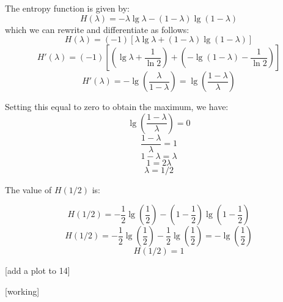 \documentclass[a4paper,12pt]{article}
\begin{document}
The entropy function is given by:
\[ H(\lambda) = -\lambda \lg \lambda - (1-\lambda) \lg (1-\lambda) \]
which we can rewrite and differentiate as follows:
\[ H(\lambda) = (-1)\left[\lambda \lg \lambda + (1-\lambda)\lg (1-\lambda) \right] \]
\[ H'(\lambda) = (-1)\left[\left( \lg \lambda + \frac{1}{\ln 2}\right) + \left(-\lg(1-\lambda) - \frac{1}{\ln 2}\right) \right] \]
\[ H'(\lambda) = -\lg \left(\frac{\lambda}{1-\lambda}\right) = \lg\left(\frac{1-\lambda}{\lambda}\right)\]

Setting this equal to zero to obtain the maximum, we have:
\[ \lg\left(\frac{1 - \lambda}{\lambda} \right) = 0 \]
\[ \frac{1 - \lambda}{\lambda} = 1 \]
\[ 1 - \lambda = \lambda \]
\[ 1 = 2 \lambda \]
\[ \lambda = 1/2 \]

The value of $H(1/2)$ is:

\[ H(1/2) = -\frac{1}{2} \lg \left(\frac{1}{2}\right) - \left(1-\frac{1}{2}\right)\lg\left(1-\frac{1}{2}\right)\]
\[ H(1/2) = -\frac{1}{2} \lg \left(\frac{1}{2}\right) - \frac{1}{2}\lg \left(\frac{1}{2}\right) = -\lg \left(\frac{1}{2}\right)\]
\[ H(1/2) = 1 \]

[add a plot to 14]

[working]
\end{document}

